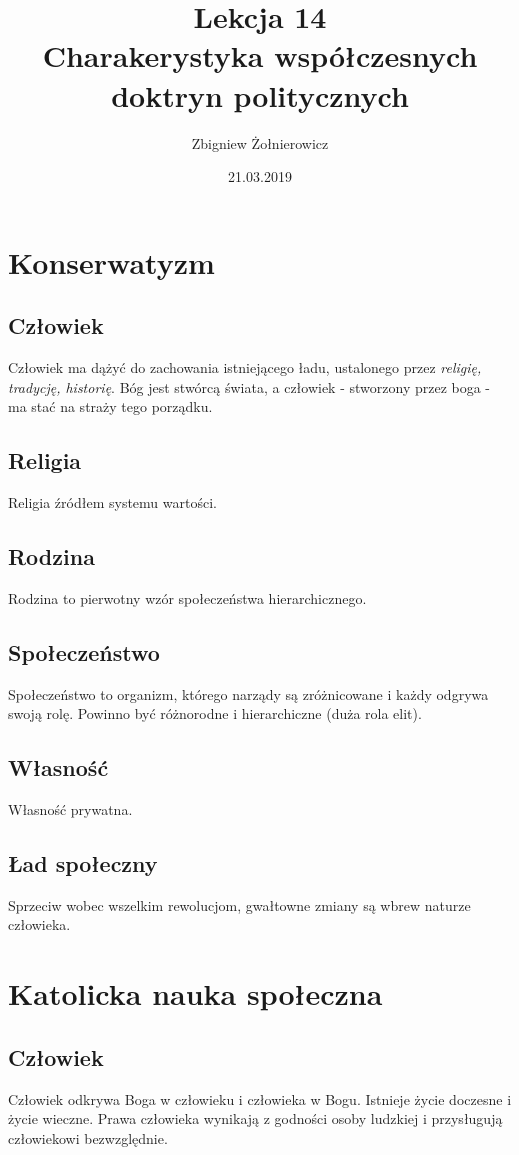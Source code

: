 \documentclass[a4paper]{article}
\begin{document}
\title{
    {\huge Lekcja 14} \\
    {\large Charakerystyka współczesnych doktryn politycznych}
}
\author{Zbigniew Żołnierowicz}
\date{21.03.2019}
\maketitle
\section{Konserwatyzm}
\subsection{Człowiek}
Człowiek ma dążyć do zachowania istniejącego ładu, ustalonego przez \emph{religię, tradycję, historię}.
Bóg jest stwórcą świata, a człowiek - stworzony przez boga - ma stać na straży tego porządku.
\subsection{Religia}
Religia źródłem systemu wartości.
\subsection{Rodzina}
Rodzina to pierwotny wzór społeczeństwa hierarchicznego.
\subsection{Społeczeństwo}
Społeczeństwo to organizm, którego narządy są zróżnicowane i każdy odgrywa swoją rolę.
Powinno być różnorodne i hierarchiczne (duża rola elit).
\subsection{Własność}
Własność prywatna.
\subsection{Ład społeczny}
Sprzeciw wobec wszelkim rewolucjom, gwałtowne zmiany są wbrew naturze człowieka.
\section{Katolicka nauka społeczna}
\subsection{Człowiek}
Człowiek odkrywa Boga w człowieku i człowieka w Bogu. Istnieje życie doczesne i życie wieczne.
Prawa człowieka wynikają z godności osoby ludzkiej i przysługują człowiekowi bezwzględnie.
\end{document}
